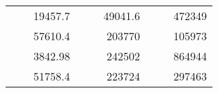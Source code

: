 \begin{table}[H]
\begin{tabular}{|ccrccrccc}
\rowcolor[HTML]{DDFDFF} 
\multicolumn{1}{|c|}{\cellcolor[HTML]{FFFFC7}}                                & \multicolumn{1}{c|}{\cellcolor[HTML]{DDFDFF}}                      & \multicolumn{1}{r|}{\cellcolor[HTML]{DAE8FC}19457.7}   & \multicolumn{1}{c|}{\cellcolor[HTML]{FFFFC7}}                                & \multicolumn{1}{c|}{\cellcolor[HTML]{DDFDFF}}                       & \multicolumn{1}{r|}{\cellcolor[HTML]{DDFDFF}49041.6}   & \multicolumn{1}{c|}{\cellcolor[HTML]{FFFFC7}}                                & \multicolumn{1}{c|}{\cellcolor[HTML]{DDFDFF}}                      & \multicolumn{1}{r|}{\cellcolor[HTML]{DDFDFF}472349}    \\ \cline{3-3} \cline{6-6} \cline{9-9} 
\multicolumn{1}{|c|}{\cellcolor[HTML]{FFFFC7}}                                & \multicolumn{1}{c|}{\cellcolor[HTML]{DDFDFF}}                      & \multicolumn{1}{r|}{\cellcolor[HTML]{DDFDFF}57610.4}   & \multicolumn{1}{c|}{\cellcolor[HTML]{FFFFC7}}                                & \multicolumn{1}{c|}{\cellcolor[HTML]{DDFDFF}}                       & \multicolumn{1}{r|}{\cellcolor[HTML]{DAE8FC}203770}    & \multicolumn{1}{c|}{\cellcolor[HTML]{FFFFC7}}                                & \multicolumn{1}{c|}{\cellcolor[HTML]{DDFDFF}}                      & \multicolumn{1}{r|}{\cellcolor[HTML]{DAE8FC}105973}    \\ \cline{3-3} \cline{6-6} \cline{9-9} 
\rowcolor[HTML]{DDFDFF} 
\multicolumn{1}{|c|}{\cellcolor[HTML]{FFFFC7}}                                & \multicolumn{1}{c|}{\cellcolor[HTML]{DDFDFF}}                      & \multicolumn{1}{r|}{\cellcolor[HTML]{DAE8FC}3842.98}   & \multicolumn{1}{c|}{\cellcolor[HTML]{FFFFC7}}                                & \multicolumn{1}{c|}{\cellcolor[HTML]{DDFDFF}}                       & \multicolumn{1}{r|}{\cellcolor[HTML]{DDFDFF}242502}    & \multicolumn{1}{c|}{\cellcolor[HTML]{FFFFC7}}                                & \multicolumn{1}{c|}{\cellcolor[HTML]{DDFDFF}}                      & \multicolumn{1}{r|}{\cellcolor[HTML]{DDFDFF}864944}    \\ \cline{3-3} \cline{6-6} \cline{9-9} 
\multicolumn{1}{|c|}{\cellcolor[HTML]{FFFFC7}}                                & \multicolumn{1}{c|}{\cellcolor[HTML]{DDFDFF}}                      & \multicolumn{1}{r|}{\cellcolor[HTML]{DDFDFF}51758.4}   & \multicolumn{1}{c|}{\cellcolor[HTML]{FFFFC7}}                                & \multicolumn{1}{c|}{\cellcolor[HTML]{DDFDFF}}                       & \multicolumn{1}{r|}{\cellcolor[HTML]{DAE8FC}223724}    & \multicolumn{1}{c|}{\cellcolor[HTML]{FFFFC7}}                                & \multicolumn{1}{c|}{\cellcolor[HTML]{DDFDFF}}                      & \multicolumn{1}{r|}{\cellcolor[HTML]{DAE8FC}297463}    \\ \cline{3-3} \cline{6-6} \cline{9-9} 

\end{tabular}
\end{table}
